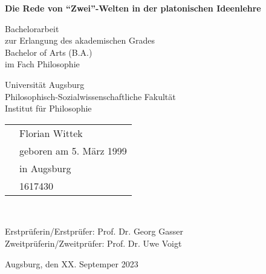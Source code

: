 \begin{titlepage}
	\begin{center}
		\vspace*{1cm}
		
		\textbf{\LARGE Die Rede von \enquote{Zwei}-Welten in der platonischen Ideenlehre}
		
		\vspace{0.5cm}
		\large
		
		Bachelorarbeit\\
		zur Erlangung des akademischen Grades\\
		Bachelor of Arts (B.A.)\\
		im Fach Philosophie\\
		\vspace {1.5cm}
	\end{center}
	\vspace{2.5cm}
	\raggedright
		Universität Augsburg\\
		Philosophisch-Sozialwissenschaftliche Fakultät\\
		Institut für Philosophie\\
		
		\vspace{1.5cm}
		
		\begin{tabular}{@{}ll}
			\makebox[2.5cm][l]{eingereicht von:} & \hspace{2cm} Florian Wittek\\
			& \hspace{2cm} geboren am 5. März 1999\\
			& \hspace{2cm} in Augsburg\\
			& \hspace{2cm} 1617430\\
		\end{tabular}\\	
		\vspace{1.5cm}

		Erstprüferin/Erstprüfer: \hspace{2cm} Prof. Dr. Georg Gasser\\
		Zweitprüferin/Zweitprüfer: \hspace{1.4cm} Prof. Dr. Uwe Voigt

		\vfill
		Augsburg, den \hspace{2.4cm} XX. Septemper 2023
		
	
\end{titlepage}